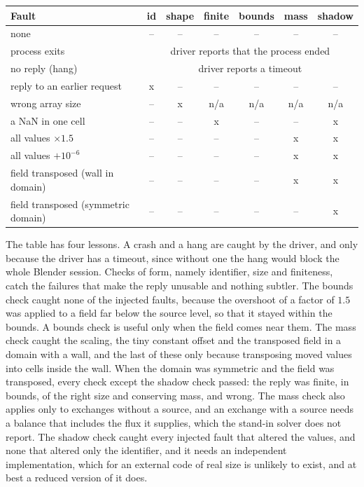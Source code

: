\begin{center}
\small
\setlength{\tabcolsep}{5pt}
\begin{tabular}{lcccccc}
\toprule
Fault & id & shape & finite & bounds & mass & shadow\\
\midrule
none & -- & -- & -- & -- & -- & --\\
process exits & \multicolumn{6}{c}{driver reports that the process ended}\\
no reply (hang) & \multicolumn{6}{c}{driver reports a timeout}\\
reply to an earlier request & x & -- & -- & -- & -- & --\\
wrong array size & -- & x & n/a & n/a & n/a & n/a\\
a NaN in one cell & -- & -- & x & -- & -- & x\\
all values $\times 1.5$ & -- & -- & -- & -- & x & x\\
all values $+10^{-6}$ & -- & -- & -- & -- & x & x\\
field transposed (wall in domain) & -- & -- & -- & -- & x & x\\
field transposed (symmetric domain) & -- & -- & -- & -- & -- & x\\
\bottomrule
\end{tabular}
\end{center}

The table has four lessons. A crash and a hang are caught by the driver, and only because the driver has a timeout, since without one the hang would block the whole Blender session. Checks of form, namely identifier, size and finiteness, catch the failures that make the reply unusable and nothing subtler. The bounds check caught none of the injected faults, because the overshoot of a factor of $1.5$ was applied to a field far below the source level, so that it stayed within the bounds. A bounds check is useful only when the field comes near them. The mass check caught the scaling, the tiny constant offset and the transposed field in a domain with a wall, and the last of these only because transposing moved values into cells inside the wall. When the domain was symmetric and the field was transposed, every check except the shadow check passed: the reply was finite, in bounds, of the right size and conserving mass, and wrong. The mass check also applies only to exchanges without a source, and an exchange with a source needs a balance that includes the flux it supplies, which the stand-in solver does not report. The shadow check caught every injected fault that altered the values, and none that altered only the identifier, and it needs an independent implementation, which for an external code of real size is unlikely to exist, and at best a reduced version of it does.

